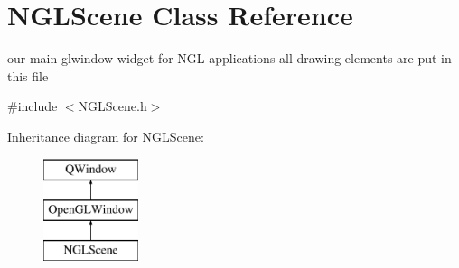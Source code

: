 \hypertarget{class_n_g_l_scene}{}\section{N\+G\+L\+Scene Class Reference}
\label{class_n_g_l_scene}


our main glwindow widget for N\+G\+L applications all drawing elements are put in this file  




{\ttfamily \#include $<$N\+G\+L\+Scene.\+h$>$}

Inheritance diagram for N\+G\+L\+Scene\+:\begin{figure}[H]
\begin{center}
\leavevmode
\includegraphics[height=3.000000cm]{class_n_g_l_scene}
\end{center}
\end{figure}
